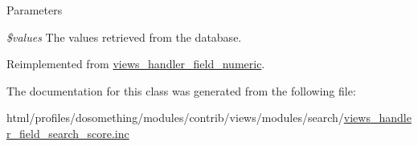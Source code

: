 \begin{DoxyParams}{Parameters}
\item[{\em \$values}]The values retrieved from the database. \end{DoxyParams}


Reimplemented from \hyperlink{classviews__handler__field__numeric_a9c76aeef951c45385fd91a22e5e656aa}{views\_\-handler\_\-field\_\-numeric}.

The documentation for this class was generated from the following file:\begin{DoxyCompactItemize}
\item 
html/profiles/dosomething/modules/contrib/views/modules/search/\hyperlink{views__handler__field__search__score_8inc}{views\_\-handler\_\-field\_\-search\_\-score.inc}\end{DoxyCompactItemize}
